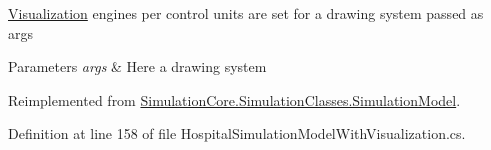 \hyperlink{namespace_sample_hospital_model_1_1_visualization}{Visualization} engines per control units are set for a drawing system passed as args 


\begin{DoxyParams}{Parameters}
{\em args} & Here a drawing system\\
\hline
\end{DoxyParams}


Reimplemented from \hyperlink{class_simulation_core_1_1_simulation_classes_1_1_simulation_model_a1bd8af0ddc3822f959a59cc598537f28}{Simulation\+Core.\+Simulation\+Classes.\+Simulation\+Model}.



Definition at line 158 of file Hospital\+Simulation\+Model\+With\+Visualization.\+cs.

